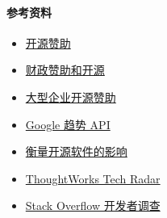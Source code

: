\hypertarget{ux53c2ux8003ux8d44ux6599}{%
\paragraph{参考资料}\label{ux53c2ux8003ux8d44ux6599}}

\begin{itemize}
\tightlist
\item
  \href{https://opensource.org/sponsors}{开源赞助}
\item
  \href{https://opensource.com/article/19/1/fiscal-sponsors-open-source}{财政赞助和开源}
\item
  \href{https://www.networkworld.com/article/2867020/big-names-like-google-dominate-open-source-funding.html}{大型企业开源赞助}
\item
  \href{https://www.npmjs.com/package/google-trends-api}{Google 趋势
  API}
\item
  \href{https://aisel.aisnet.org/cgi/viewcontent.cgi?article=1496\&context=amcis2018}{衡量开源软件的影响}
\item
  \href{https://www.thoughtworks.com/radar}{ThoughtWorks Tech Radar}
\item
  \href{https://insights.stackoverflow.com/survey/2019\#technology}{Stack
  Overflow 开发者调查}
\end{itemize}
